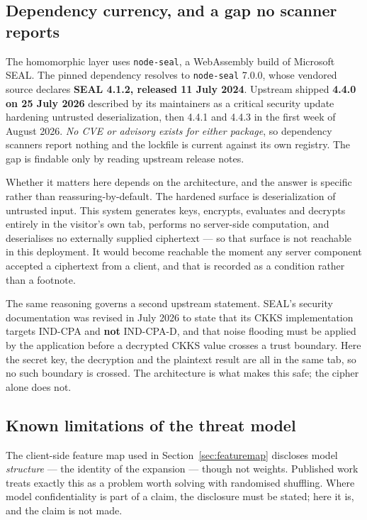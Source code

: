 \documentclass[11pt,a4paper]{article}
\begin{document}
\subsection{Dependency currency, and a gap no scanner reports}
The homomorphic layer uses \texttt{node-seal}, a WebAssembly build of Microsoft SEAL. The pinned
dependency resolves to \texttt{node-seal} 7.0.0, whose vendored source declares \textbf{SEAL 4.1.2,
released 11 July 2024}. Upstream shipped \textbf{4.4.0 on 25 July 2026} described by its maintainers
as a critical security update hardening untrusted deserialization, then 4.4.1 and 4.4.3 in the first
week of August 2026. \emph{No CVE or advisory exists for either package}, so dependency scanners
report nothing and the lockfile is current against its own registry. The gap is findable only by
reading upstream release notes.

Whether it matters here depends on the architecture, and the answer is specific rather than
reassuring-by-default. The hardened surface is deserialization of untrusted input. This system
generates keys, encrypts, evaluates and decrypts entirely in the visitor's own tab, performs no
server-side computation, and deserialises no externally supplied ciphertext --- so that surface is
not reachable in this deployment. It would become reachable the moment any server component accepted
a ciphertext from a client, and that is recorded as a condition rather than a footnote.

The same reasoning governs a second upstream statement. SEAL's security documentation was revised in
July 2026 to state that its CKKS implementation targets IND-CPA and \textbf{not} IND-CPA-D, and that
noise flooding must be applied by the application before a decrypted CKKS value crosses a trust
boundary. Here the secret key, the decryption and the plaintext result are all in the same tab, so no
such boundary is crossed. The architecture is what makes this safe; the cipher alone does not.

\subsection{Known limitations of the threat model}
The client-side feature map used in Section~\ref{sec:featuremap} discloses model \emph{structure}
--- the identity of the expansion --- though not weights. Published work treats exactly this as a
problem worth solving with randomised shuffling. Where model confidentiality is part of a claim, the
disclosure must be stated; here it is, and the claim is not made.
\end{document}
